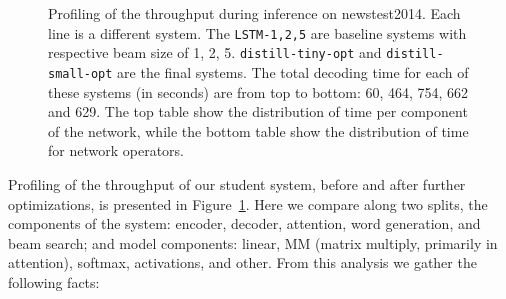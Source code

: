 \documentclass[11pt,a4paper]{article}
\begin{document}
\begin{figure}
\caption{\small Profiling of the throughput during inference on newstest2014. Each line is a different system. The {\tt LSTM-1,2,5} are baseline systems with respective beam size of 1, 2, 5. {\tt distill-tiny-opt} and {\tt distill-small-opt} are the final systems. The total decoding time for each of these systems (in seconds) are from top to bottom: 60, 464, 754, 662 and 629. The top table show the distribution of time per component of the network, while the bottom table show the distribution of time for network operators.}
\label{fig:decoding_cost}
\end{figure}


Profiling of the throughput of our student system, before
and after further optimizations, is presented in Figure~\ref{fig:decoding_cost}. Here we compare along two splits,
the components of the system: encoder, decoder, attention, word generation, and beam search; and model components: linear, MM (matrix multiply, primarily in attention), softmax, activations, and other.
From this analysis we gather the following facts:
\end{document}

